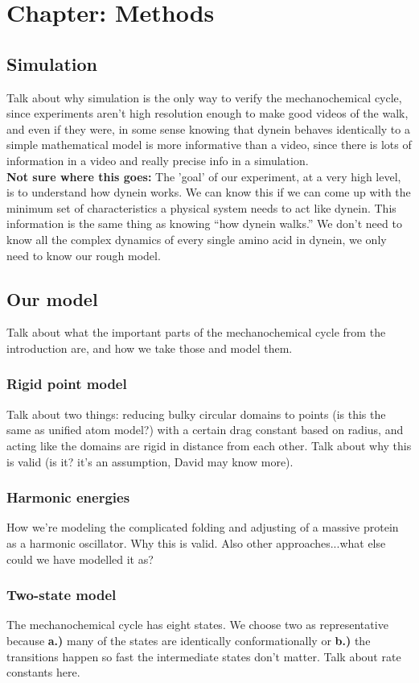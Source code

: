 \documentclass[10pt]{article} %
\begin{document}
\section{Chapter: Methods}
\subsection{Simulation}
Talk about why simulation is the only way to verify the mechanochemical cycle, since experiments
aren't high resolution enough to make good videos of the walk, and even if they were, in some sense
knowing that dynein behaves identically to a simple mathematical model is more informative than
a video, since there is lots of information in a video and really precise info in a simulation.\\

\textbf{Not sure where this goes:} The 'goal' of our experiment, at a very high level, is to
understand how dynein works. We can know this if we can come up with the minimum set of characteristics a physical system needs to act like dynein. This information is the same thing as knowing
``how dynein walks.'' We don't need to know all the complex dynamics of every single amino acid in
dynein, we only need to know our rough model.\\

\subsection{Our model}
Talk about what the important parts of the mechanochemical cycle from the introduction are, and how
we take those and model them.\\
\subsubsection{Rigid point model}
Talk about two things: reducing bulky circular domains to points (is this the same as unified atom
model?) with a certain drag constant based on radius, and acting like the domains are rigid in
distance from each other. Talk about why this is valid (is it? it's an assumption, David may know
more).
\subsubsection{Harmonic energies}
How we're modeling the complicated folding and adjusting of a massive protein as a harmonic
oscillator. Why this is valid. Also other approaches...what else could we have modelled it as?
\subsubsection{Two-state model}
The mechanochemical cycle has eight states. We choose two as representative because \textbf{a.)}
many of the states are identically conformationally or \textbf{b.)} the transitions happen so fast
the intermediate states don't matter. Talk about rate constants here.
\end{document}
